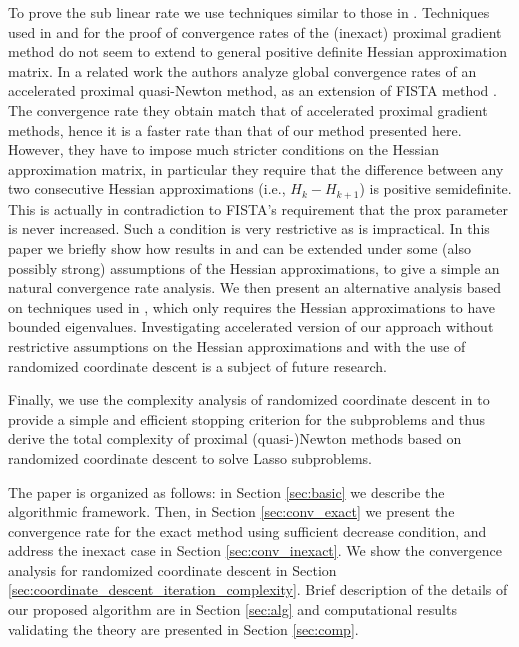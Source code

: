 \documentclass[11pt]{article}
\numberwithin{equation}{section}
\begin{document}
To prove the sub linear rate  we use techniques similar to those in  \cite{Cartisetal2012}. Techniques used in 
  \cite{Beck2009} and \cite{Schmidtetal} for the proof of convergence rates of the (inexact) proximal gradient method do not seem to extend 
 to  general positive definite Hessian approximation matrix.  In a  related work \cite{Jiangetal2012}  the authors analyze global convergence rates of an accelerated proximal quasi-Newton method, as an extension of FISTA method \cite{Beck2009}. The convergence rate they obtain match that of accelerated proximal gradient methods, hence it is a faster rate
than that of our method presented here. However,  they have to impose much stricter conditions on the Hessian approximation matrix, in particular they require  that the difference between any two consecutive Hessian approximations (i.e., $H_{k}-H_{k+1}$) is positive semidefinite. This is actually in contradiction to   FISTA's  requirement  that the prox parameter is never increased. Such a condition is very restrictive 
as is impractical. In this paper we briefly show how  results in \cite{Beck2009} and \cite{Schmidtetal}  can be extended under some 
(also possibly strong) assumptions of the Hessian approximations, to give a simple an natural convergence rate analysis. 
We then present an alternative analysis  based on techniques used in \cite{}, which only requires the Hessian approximations to have bounded eigenvalues. 
Investigating accelerated version of our approach without restrictive assumptions on the Hessian approximations and with the use of randomized coordinate descent is a subject of future research. 

 
 
 

 
 Finally, we use the complexity analysis of randomized coordinate descent in \cite{Richtarik2012} to provide a simple and efficient stopping criterion for the subproblems and thus derive the total complexity of  proximal (quasi-)Newton methods based on randomized coordinate descent to solve Lasso subproblems. 

 
 
 
The paper is organized as follows: in Section \ref{sec:basic}  we describe the  algorithmic framework. Then,  in Section \ref{sec:conv_exact}  we 
present the  convergence rate for the exact method using sufficient decrease condition, and address the inexact case in  Section \ref{sec:conv_inexact}.
We show the convergence analysis for randomized coordinate descent in Section \ref{sec:coordinate_descent_iteration_complexity}. 
Brief description of the details of our  proposed algorithm are in Section \ref{sec:alg} and  computational results  validating the theory are  presented in Section \ref{sec:comp}.
\end{document}
